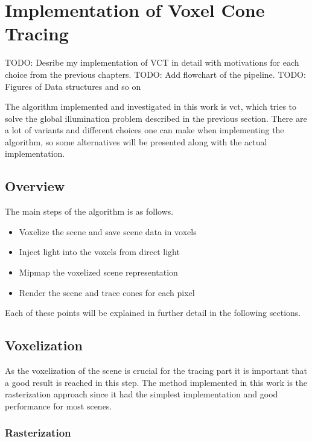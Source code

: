 \chapter{Implementation of Voxel Cone Tracing}\label{cha:implementation}

TODO: Desribe my implementation of VCT in detail with motivations for each choice from the previous chapters.
TODO: Add flowchart of the pipeline.
TODO: Figures of Data structures and so on

The algorithm implemented and investigated in this work is \gls{vct}, which tries to solve the global illumination problem described in the previous section. There are a lot of variants and different choices one can make when implementing the algorithm, so some alternatives will be presented along with the actual implementation.

\section{Overview}

The main steps of the algorithm is as follows.

\begin{itemize}
    \item Voxelize the scene and save scene data in voxels
    \item Inject light into the voxels from direct light 
    \item Mipmap the voxelized scene representation
    \item Render the scene and trace cones for each pixel
\end{itemize}

Each of these points will be explained in further detail in the following sections.

\section{Voxelization}

As the voxelization of the scene is crucial for the tracing part it is important that a good result is reached in this step. The method implemented in this work is the rasterization approach since it had the simplest implementation and good performance for most scenes.

\subsection{Rasterization}

